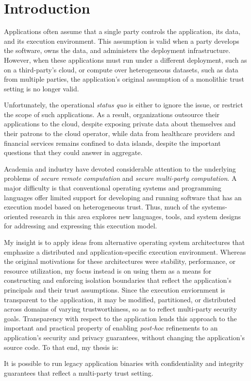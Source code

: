 \section{Introduction}
\label{sec:intro}

Applications often assume that a single party controls the application, its
data, and its execution environment.
%
This assumption is valid when a party develops the software, owns the data, 
and administers the deployment infrastructure.
%
However, when these applications must run under a different deployment, such as
on a third-party's cloud, or compute over heterogeneous datasets, such as data
from multiple parties, the application's original assumption of a monolithic
trust setting is no longer valid.


Unfortunately, the operational \emph{status quo} is either to ignore the issue,
or restrict the scope of such applications.  
%
As a result, organizations outsource their applications to the cloud, despite
exposing private data about themselves and their patrons to the cloud operator,
while data from healthcare providers and financial services remains confined to
data islands, despite the important questions that they could answer in
aggregate.



Academia and industry have devoted considerable attention to the underlying
problems of \emph{secure remote computation} and \emph{secure multi-party
computation}.
%
A major difficulty is that conventional operating systems and
programming languages offer limited support for developing and running software
that has an execution model based on heterogeneous trust.
%
Thus, much of the systems-oriented research in this area explores new
languages, tools, and system designs for addressing and expressing this
execution model.


My insight is to apply ideas from alternative operating system
architectures that emphasize a distributed and application-specific execution
environment.
%
Whereas the original motivations for these architectures were stability,
performance, or resource utilization, my focus instead is on using them as a
means for constructing and enforcing isolation boundaries that reflect the
application's principals and their trust assumptions.
%
Since the execution enviornment is transparent to the application, 
it may be modified, partitioned, or distributed across domains of varying
trustworthiness, so as to reflect multi-party security goals.
%
Transparency with respect to the application lends this approach to the
important and practical property of enabling \emph{post-hoc} refinements to an
application's security and privacy guarantees, without changing the
application's source code.
To that end, my thesis is:
\begin{displayquote}
    It is possible to run legacy application binaries with confidentiality and 
    integrity guarantees that reflect a multi-party trust setting.
\end{displayquote}


